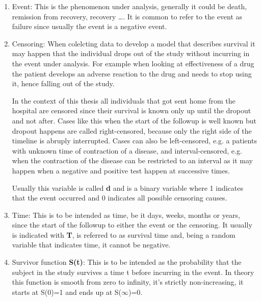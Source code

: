 \begin{enumerate}
\item Event: This is the phenomenon under analysis, generally it could be death, remission from recovery, recovery \ldots .
It is common to refer to the event as failure since usually the event is a negative event.
\item Censoring: When colelcting data to develop a model that describes survival it may happen that the individual drops out of the study without incurring in the event under analysis.
For example when looking at effectiveness of a drug the patient develops an adverse reaction to the drug and needs to stop using it, hence falling out of the study.

In the context of this thesis all individuals that got sent home from the hospital are censored since their survival is known only up until the dropout and not after.
Cases like this when the start of the followup is well known but dropout happens are called right-censored, because only the right side of the timeline is abruply interrupted.
Cases can also be left-censored, e.g. a patients with unknown time of contraction of a disease, and interval-censored, e.g. when the contraction of the disease can be restricted to an interval as it may happen when a negative and positive test happen at successive times.

Usually this variable is called \textbf{d} and is a binary variable where 1 indicates that the event occurred and 0 indicates all possible censoring causes.
\item Time: This is to be intended as time, be it days, weeks, months or years, since the start of the followup to either the event or the censoring.
It usually is indicated with \textbf{T}, is referred to as survival time and, being a random variable that indicates time, it cannot be negative.
\item Survivor function \textbf{S(t)}: This is to be intended as the probability that the subject in the study survives a time t before incurring in the event.
In theory this function is smooth from zero to infinity, it's strictly non-increasing, it starts at S(0)=1 and ends up at S($\infty$)=0.


\end{enumerate}
